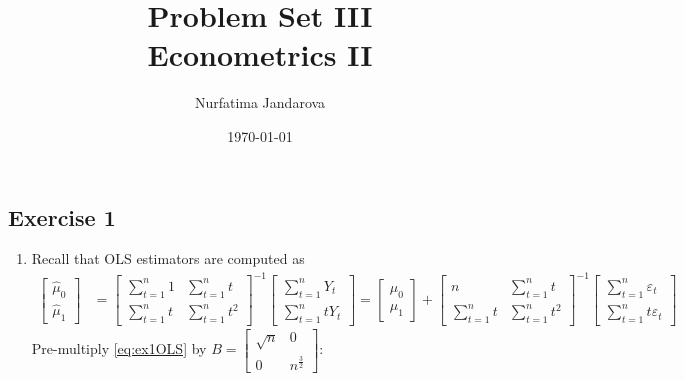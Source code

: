 \documentclass[]{article}
\title{Problem Set III \\ \large Econometrics II}
\author{Nurfatima Jandarova}
\date{\today}
\begin{document}
\maketitle

\subsection*{Exercise 1}
\begin{enumerate}[label=(\alph*)]
	\item Recall that OLS estimators are computed as
	\begin{equation}
	\begin{split}
	\begin{bmatrix}
	\hat{\mu}_0 \\ \hat{\mu}_1
	\end{bmatrix}& = \begin{bmatrix}\sum\limits_{t = 1}^n1 & \sum\limits_{t = 1}^nt \\ \sum\limits_{t = 1}^nt & \sum\limits_{t = 1}^nt^2
	\end{bmatrix}^{-1}\begin{bmatrix}\sum\limits_{t = 1}^nY_t \\ \sum\limits_{t = 1}^ntY_t\end{bmatrix} = \begin{bmatrix}
	\mu_0 \\ \mu_1\end{bmatrix} + \begin{bmatrix}n & \sum\limits_{t = 1}^nt \\ \sum\limits_{t = 1}^nt & \sum\limits_{t = 1}^nt^2\end{bmatrix}^{-1}\begin{bmatrix}\sum\limits_{t = 1}^n\varepsilon_t \\ \sum\limits_{t = 1}^nt\varepsilon_t\end{bmatrix}
	\end{split}
	\label{eq:ex1OLS}
	\end{equation}
	Pre-multiply \eqref{eq:ex1OLS} by $B = \begin{bmatrix}\sqrt{n} & 0 \\ 0 & n^{\frac{3}{2}}\end{bmatrix}$:
	\begin{equation}
	\begin{split}

\end{split}
\end{equation}
\end{enumerate}
\end{document}
